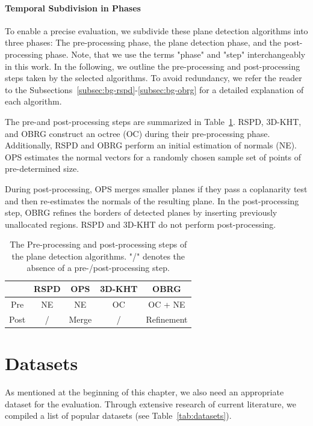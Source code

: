 \documentclass[main.tex]{subfiles}
\begin{document}
\paragraph{Temporal Subdivision in Phases}
\label{par:prepostalgos}
To enable a precise evaluation, we subdivide these plane detection algorithms into three phases:
The pre-processing phase, the plane detection phase, and the post-processing phase. Note, that
we use the terms "phase" and "step" interchangeably in this work. In the following, we outline
the pre-processing and post-processing steps taken by the selected algorithms. To avoid redundancy,
we refer the reader to the Subsections~\ref{subsec:bg-rspd}-\ref{subsec:bg-obrg} for a detailed explanation of each
algorithm.

The pre-and post-processing steps are summarized in Table~\ref{tab:pre-post}.
RSPD, 3D-KHT, and OBRG construct an octree (OC) during their pre-processing phase.
Additionally, RSPD and OBRG perform an initial estimation of normals (NE).
OPS estimates the normal vectors for a randomly chosen sample set of points of pre-determined size.

During post-processing, OPS merges smaller planes if they pass a coplanarity test and then re-estimates the normals of the
resulting plane. In the post-processing step, OBRG refines the borders of detected planes by inserting
previously unallocated regions. RSPD and 3D-KHT do not perform post-processing.


\begin{table}[H]
    \centering
    \begin{tabular}{c|cccc}
             & RSPD & OPS   & 3D-KHT & OBRG       \\ \hline
        Pre  & NE   & NE    & OC     & OC + NE    \\
        Post & /    & Merge & /      & Refinement
    \end{tabular}
    \caption{The Pre-processing and post-processing steps of the plane detection algorithms. "/" denotes the absence of
        a pre-/post-processing step.}
    \label{tab:pre-post}
\end{table}




\section{Datasets}
\label{sec:datasets}
As mentioned at the beginning of this chapter, we also need an appropriate dataset for the evaluation.
Through extensive research of current literature, we compiled a list of popular datasets (see Table~\ref{tab:datasets}).
\end{document}
